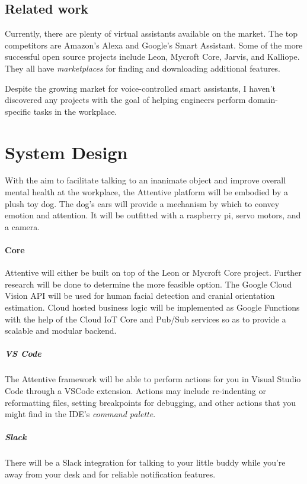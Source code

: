 \documentclass{article}
\begin{document}
\begin{multicols}{2}
\subsection{Related work}

Currently, there are plenty of virtual assistants available on the market. The top competitors are Amazon's Alexa and Google's Smart Assistant. Some of the more successful open source projects include Leon, Mycroft Core, Jarvis, and Kalliope. They all have \textit{marketplaces} for finding and downloading additional features. \cite{awesomeopensource2020}

Despite the growing market for voice-controlled smart assistants, I haven't discovered any projects with the goal of helping engineers perform domain-specific tasks in the workplace.



\section{System Design}

With the aim to facilitate talking to an inanimate object and improve overall mental health at the workplace, the Attentive platform will be embodied by a plush toy dog.
The dog's ears will provide a mechanism by which to convey emotion and attention.
It will be outfitted with a raspberry pi, servo motors, and a camera.

\paragraph{Core}
Attentive will either be built on top of the Leon or Mycroft Core project. \cite{leondocs2020}\cite{mycroftai2020}
Further research will be done to determine the more feasible option.
The Google Cloud Vision API will be used for human facial detection and cranial orientation estimation. 
Cloud hosted business logic will be implemented as Google Functions with the help of the Cloud IoT Core and Pub/Sub services so as to provide a scalable and modular backend.

\subparagraph{VS Code}
The Attentive framework will be able to perform actions for you in Visual Studio Code through a VSCode extension. Actions may include re-indenting or reformatting files, setting breakpoints for debugging, and other actions that you might find in the IDE's \textit{command palette}. \cite{vscodeextensioncapabilities2020}
\subparagraph{Slack} 
There will be a Slack integration for talking to your little buddy while you're away from your desk and for reliable notification features. \cite{slackentrypoints2020}


\end{multicols}
\end{document}

